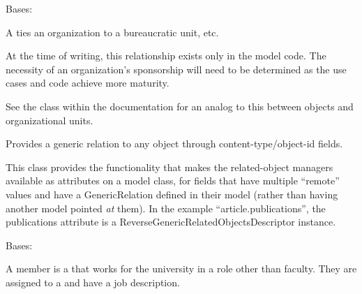 \documentclass[letterpaper,10pt,english]{sphinxmanual}
\begin{document}
\begin{fulllineitems}
\label{generated/apps.profiles.models:apps.profiles.models.Sponsorship}
Bases: {\hyperref[generated/apps.profiles.models:apps.profiles.models.BaseModel]{}}

A  ties an organization to a bureaucratic unit, etc.

At the time of writing, this relationship exists only in the model code.
The necessity of an organization's sponsorship will need to be determined
as the  use cases and code achieve more maturity.

See the  class within the  documentation for
an analog to this between  objects and organizational units.


\begin{fulllineitems}
\label{generated/apps.profiles.models:apps.profiles.models.Sponsorship.content_object}
Provides a generic relation to any object through content-type/object-id
fields.

\end{fulllineitems}



\begin{fulllineitems}
\label{generated/apps.profiles.models:apps.profiles.models.Sponsorship.unit_permissions}
This class provides the functionality that makes the related-object
managers available as attributes on a model class, for fields that have
multiple ``remote'' values and have a GenericRelation defined in their model
(rather than having another model pointed \emph{at} them). In the example
``article.publications'', the publications attribute is a
ReverseGenericRelatedObjectsDescriptor instance.

\end{fulllineitems}


\end{fulllineitems}



\begin{fulllineitems}
\label{generated/apps.profiles.models:apps.profiles.models.Staff}
Bases: {\hyperref[generated/apps.profiles.models:apps.profiles.models.Person]{}}

A  member is a  that works for the university in a role
other than faculty.  They are assigned to a  and have a 
job description.

\end{fulllineitems}
\end{document}

